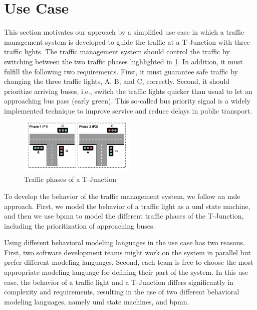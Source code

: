 \documentclass{jot}
\begin{document}
\section{Use Case} \label{sec:usecase}
This section motivates our approach by a simplified use case in which a traffic management system is developed to guide the traffic at a T-Junction with three traffic lights.
The traffic management system should control the traffic by switching between the two traffic phases highlighted in \cref{fig:junction-phases}.
In addition, it must fulfill the following two requirements.
First, it must guarantee safe traffic by changing the three traffic lights, A, B, and C, correctly.
Second, it should prioritize arriving buses, i.e., switch the traffic lights quicker than usual to let an approaching bus pass (early green).
This so-called bus priority signal is a widely implemented technique to improve service and reduce delays in public transport.

\begin{figure}[h]
    \centering
    \includegraphics[width=0.5\textwidth]{figures/phases.pdf}
    \caption{Traffic phases of a T-Junction}
    \label{fig:junction-phases}
\end{figure}

To develop the behavior of the traffic management system, we follow an \gls*{mde} approach.
First, we model the behavior of a traffic light as a \gls*{uml} state machine, and then we use \gls*{bpmn} to model the different traffic phases of the T-Junction, including the prioritization of approaching buses.

Using different behavioral modeling languages in the use case has two reasons.
First, two software development teams might work on the system in parallel but prefer different modeling languages.
Second, each team is free to choose the most appropriate modeling language for defining their part of the system.
In this use case, the behavior of a traffic light and a T-Junction differs significantly in complexity and requirements, resulting in the use of two different behavioral modeling languages, namely \gls*{uml} state machines, and \gls*{bpmn}.
\end{document}
